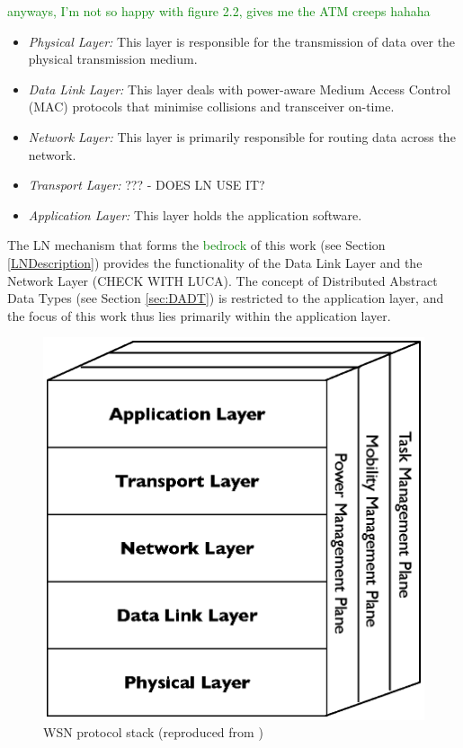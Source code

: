 \textcolor{green}{anyways, I'm not so happy with figure 2.2, gives me the ATM creeps hahaha}

\begin{itemize}
\item \emph{Physical Layer:} This layer is responsible for the transmission of 
data over the physical transmission medium.
\item \emph{Data Link Layer:} This layer deals with power-aware Medium Access 
Control (MAC) protocols that minimise collisions and transceiver on-time.
\item \emph{Network Layer:} This layer is primarily responsible for routing  
data across the network.
\item \emph{Transport Layer:} ??? - DOES LN USE IT?
\item \emph{Application Layer:} This layer holds the application software.
\end{itemize}

The LN mechanism that forms the \textcolor{green}{bedrock} of this work (see 
Section \ref{LNDescription}) provides the functionality of the Data Link Layer 
and the Network Layer (CHECK WITH LUCA). The concept of Distributed Abstract
Data Types (see Section \ref{sec:DADT}) is restricted to the application layer,
and the focus of this work thus lies primarily within the application layer.

\begin{figure}
\centering
\label{Fig:ProtStack}
\includegraphics[scale=0.6]{img/ProtStack.eps}\caption[WSN protocol stack]{WSN protocol
stack (reproduced from \cite{SensorSurveyAkyildiz:2002})}
\end{figure}

